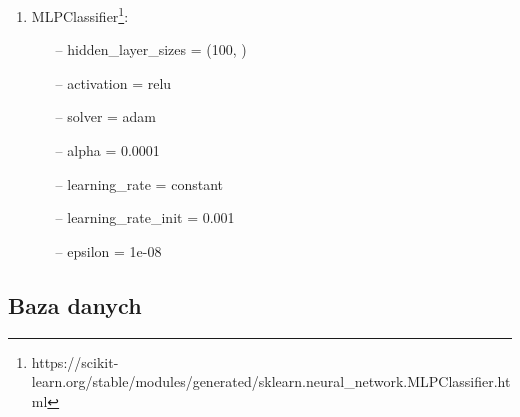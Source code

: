 \documentclass[polish,12pt]{aghthesis}
\begin{document}
\begin{itemize}
\begin{enumerate}
        \item MLPClassifier\footnote{https://scikit-learn.org/stable/modules/generated/sklearn.neural\_network.MLPClassifier.html}:
        
        \begin{itemize}
                \setlength\itemsep{0,1em}
                \item[--] hidden\_layer\_sizes = (100, )
                \item[--] activation = relu
                \item[--] solver = adam
                \item[--] alpha = 0.0001
                \item[--] learning\_rate = constant
                \item[--] learning\_rate\_init = 0.001
                \item[--] epsilon = 1e-08
            \end{itemize}
    \end{enumerate}
\end{itemize}

\subsection{Baza danych}
\end{document}
